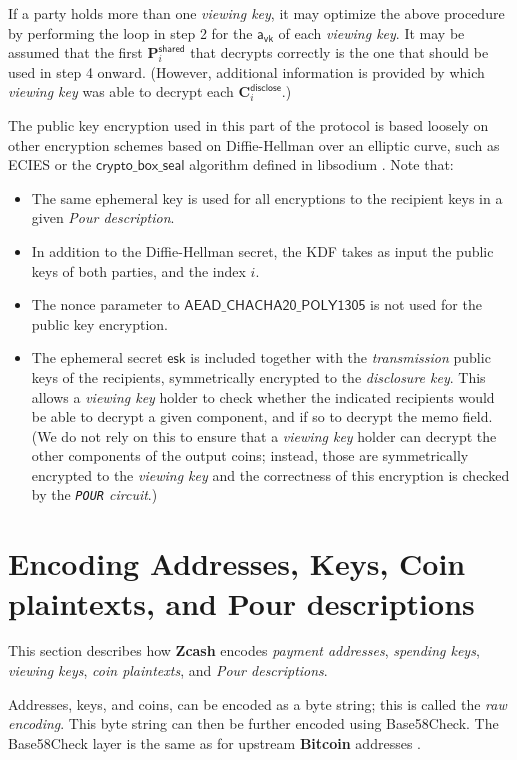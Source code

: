 \documentclass{article}
\newcommand{\term}[1]{\textsl{#1}\xspace}
\newcommand{\termbf}[1]{\textbf{#1}\xspace}
\newcommand{\Zcash}{\termbf{Zcash}}
\newcommand{\Bitcoin}{\termbf{Bitcoin}}
\newcommand{\PourDescription}{\term{Pour description}}
\newcommand{\PourDescriptions}{\term{Pour descriptions}}
\newcommand{\paymentAddresses}{\term{payment addresses}}
\newcommand{\viewingKey}{\term{viewing key}}
\newcommand{\viewingKeys}{\term{viewing keys}}
\newcommand{\spendingKeys}{\term{spending keys}}
\newcommand{\coinPlaintexts}{\term{coin plaintexts}}
\newcommand{\transmitKeypair}{\term{transmission}}
\newcommand{\discloseKey}{\term{disclosure key}}
\newcommand{\DiscloseKey}{\mathsf{a_{vk}}}
\newcommand{\disclose}{\mathsf{disclose}}
\newcommand{\shared}{\mathsf{shared}}
\newcommand{\EphemeralPrivate}{\mathsf{esk}}
\newcommand{\Plaintext}{\mathbf{P}}
\newcommand{\Ciphertext}{\mathbf{C}}
\newcommand{\DiscloseCiphertext}[1]{\Ciphertext^\disclose_{#1}}
\newcommand{\SharedPlaintext}[1]{\Plaintext^\shared_{#1}}
\newcommand{\SymSpecific}{\mathsf{AEAD\_CHACHA20\_POLY1305}}
\newcommand{\CryptoBoxSeal}{\mathsf{crypto\_box\_seal}}
\newcommand{\PourCircuit}{\term{\texttt{POUR} circuit}}
\begin{document}
{If a party holds more than one \viewingKey, it may optimize the above
procedure by performing the loop in step 2 for the $\DiscloseKey{}$ of each
\viewingKey. It may be assumed that the first $\SharedPlaintext{i}$ that
decrypts correctly is the one that should be used in step 4 onward.
(However, additional information is provided by which \viewingKey was able
to decrypt each $\DiscloseCiphertext{i}$.)

The public key encryption used in this part of the protocol is based loosely on
other encryption schemes based on Diffie-Hellman over an elliptic curve, such
as ECIES or the $\CryptoBoxSeal$ algorithm defined in libsodium \cite{cryptoboxseal}.
Note that:
\begin{itemize}
  \item The same ephemeral key is used for all encryptions to the recipient keys
        in a given \PourDescription.
  \item In addition to the Diffie-Hellman secret, the KDF takes as input the
        public keys of both parties, and the index $i$.
  \item The nonce parameter to $\SymSpecific$ is not used for the public key
        encryption.
  \item The ephemeral secret $\EphemeralPrivate$ is included together with
        the \transmitKeypair public keys of the recipients, symmetrically
        encrypted to the \discloseKey.
        This allows a \viewingKey holder to check whether the
        indicated recipients would be able to decrypt a given component, and
        if so to decrypt the memo field. (We do not rely on this to ensure
        that a \viewingKey holder can decrypt the other components of the
        output coins; instead, those are symmetrically encrypted to the
        \viewingKey and the correctness of this encryption is checked by the
        \PourCircuit.)
\end{itemize}
}


\section{Encoding Addresses, Keys, Coin plaintexts, and Pour descriptions}

This section describes how \Zcash encodes \paymentAddresses, \spendingKeys,
\viewingKeys, \coinPlaintexts, and \PourDescriptions.

Addresses, keys, and coins, can be encoded as a byte string; this is called
the \term{raw encoding}. This byte string can then be further encoded using
Base58Check. The Base58Check layer is the same as for upstream \Bitcoin
addresses \cite{Base58Check}.
\end{document}
